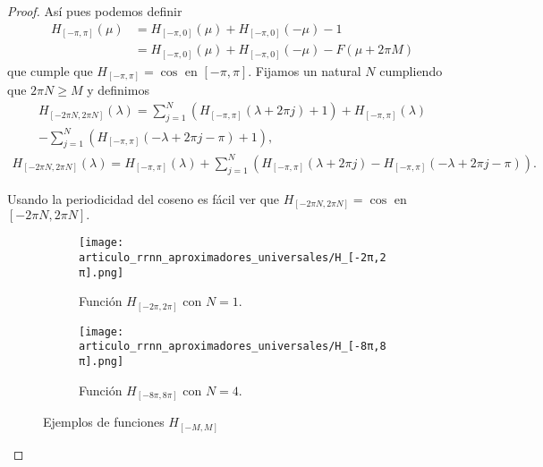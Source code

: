 \begin{proof}
    Así pues podemos definir 
    \begin{equation}
        \begin{split}
            H_{[-\pi, \pi ]}(\mu) &= H_{[-\pi, 0]}(\mu) + H_{[-\pi, 0]}(-\mu) - 1 \\
            &= H_{[-\pi, 0]}(\mu) + H_{[-\pi, 0]}(-\mu) - F(\mu + 2 \pi M) 
        \end{split} 
    \end{equation}  
    que cumple que $H_{[-\pi, \pi ]} = \cos$ en $[-\pi, \pi]$.
    Fijamos un natural $N$ cumpliendo que $2 \pi N \geq M$ 
    y definimos  
    \begin{equation}
    \begin{split}
        H_{[-2\pi N, 2 \pi N]} (\lambda) = 
        \sum_{j=1}^N (H_{[-\pi, \pi ]}(\lambda + 2 \pi j) +1) 
        + H_{[-\pi, \pi ]}(\lambda)  \\
        - \sum_{j=1}^N (H_{[-\pi, \pi ]}(- \lambda + 2 \pi j - \pi) +1),
    \end{split}
\end{equation}
\begin{equation}
    \begin{split}
        H_{[-2\pi N, 2 \pi N]} (\lambda) 
        =  H_{[-\pi, \pi ]}(\lambda) + 
        \sum_{j=1}^N (
            H_{[-\pi, \pi ]}(\lambda + 2 \pi j)
            - 
            H_{[-\pi, \pi ]}(- \lambda + 2 \pi j - \pi)
        ) .         
    \end{split}
    \end{equation}

    Usando la periodicidad del coseno es fácil ver que 
    $H_{[-2\pi N, 2 \pi N]} = \cos$ en $[-2\pi N, 2 \pi N].$
      \begin{figure}[h]
        \centering
        \begin{subfigure}[b]{0.45\textwidth}
            \centering
            \texttt{[image: articulo\_rrnn\_aproximadores\_universales/H\_[-2π,2π].png]}
            \caption{Función $H_{[-2\pi, 2\pi]}$ con $N=1$.}
            \label{fig:H_con_M}
        \end{subfigure}
        \hfill
        \begin{subfigure}[b]{0.45\textwidth}
            \centering
            \texttt{[image: articulo\_rrnn\_aproximadores\_universales/H\_[-8π,8π].png]}
            \caption{Función $H_{[-8\pi, 8\pi]}$ con $N=4$. }
        \end{subfigure}
        \hfill
        \caption{Ejemplos de funciones $H_{[-M, M]}$}
    \end{figure}


\end{proof}
